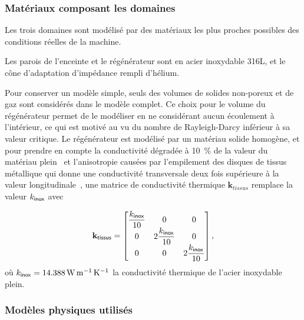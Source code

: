 \subsubsection{Matériaux composant les domaines}
Les trois domaines sont modélisé par des matériaux les plus proches possibles des conditions réelles de la machine.\smallskip

Les parois de l'enceinte et le régénérateur sont en acier inoxydable 316L, et le cône d'adaptation d'impédance rempli d'hélium.

Pour conserver un modèle simple, seuls des volumes de solides non-poreux et de gaz sont considérés dans le modèle complet. Ce choix pour le volume du régénérateur permet de le modéliser en ne considérant aucun écoulement à l'intérieur, ce qui est motivé au vu du nombre de Rayleigh-Darcy inférieur à sa valeur critique. Le régénérateur est modélisé par un matériau solide homogène, et pour prendre en compte la conductivité dégradée à \qty{10}{\percent} de la valeur du matériau plein~\cite{lewis_measurement_1998, swift_thermoacoustics_2017} et l'anisotropie causées par l'empilement des disques de tissus métallique qui donne une conductivité transversale deux fois supérieure à la valeur longitudinale~\cite{li_effective_2006, hsu_effective_1996}, une matrice de conductivité thermique $\mathbf k_{tissus}$ remplace la valeur $k_{\sf inox}$ avec

\begin{equation}
	\mathbf k_{\sf tissus} = \begin{bmatrix}
		\dfrac{k_{\sf inox}}{10} & 0 & 0 \\
		0 & 2\dfrac{k_{\sf inox}}{10} & 0 \\
		0 & 0 & 2\dfrac{k_{\sf inox}}{10}
	\end{bmatrix},
	\label{eq:ConductiviteTensiorielle}
\end{equation}
où $k_{\sf inox}=\qty{14.388}{\watt\per\meter\per\kelvin}$ la conductivité thermique de l'acier inoxydable plein. 


\subsubsection{Modèles physiques utilisés}\label{chap:FEM_Physique}


